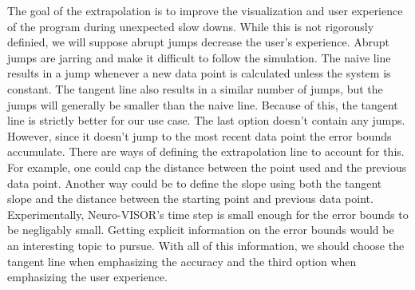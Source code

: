 The goal of the extrapolation is to improve the visualization and user experience of the program during unexpected slow downs.
While this is not rigorously definied, we will suppose abrupt jumps decrease the user's experience.
Abrupt jumps are jarring and make it difficult to follow the simulation.
The naive line results in a jump whenever a new data point is calculated unless the system is constant.
The tangent line also results in a similar number of jumps, but the jumps will generally be smaller than the naive line.
Because of this, the tangent line is strictly better for our use case.
The last option doesn't contain any jumps.
However, since it doesn't jump to the most recent data point the error bounds accumulate.
There are ways of defining the extrapolation line to account for this.
For example, one could cap the distance between the point used and the previous data point.
Another way could be to define the slope using both the tangent slope and the distance between the starting point and previous data point.
Experimentally, Neuro-VISOR's time step is small enough for the error bounds to be negligably small\cite{neuropy}.
Getting explicit information on the error bounds would be an interesting topic to pursue.
With all of this information, we should choose the tangent line when emphasizing the accuracy and the third option when emphasizing the user experience.
